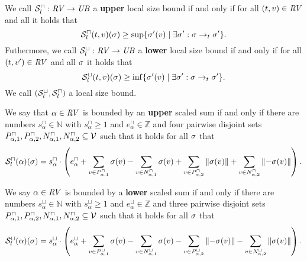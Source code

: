 \begin{definition}
  We call ${\mathcal{S}^\sqcap_l}: \mathit{RV} \rightarrow \mathit{UB}$ a \textbf{upper} local size bound if and only if for all $(t, v) \in \mathit{RV}$ and all  it holds that
  \[ {\mathcal{S}^\sqcap_l}(t, v)(\sigma) \geq \sup \lbrace \sigma'(v) \mid \exists \sigma': \sigma \rightarrow_t \sigma' \rbrace. \]
  Futhermore, we call ${\mathcal{S}^\sqcup_l}: \mathit{RV} \rightarrow \mathit{UB}$ a \textbf{lower} local size bound if and only if for all $(t, v') \in \mathit{RV}$ and all $\sigma$ it holds that
  \[ {\mathcal{S}^\sqcup_l}(t, v)(\sigma) \geq \inf \lbrace \sigma'(v) \mid \exists \sigma': \sigma \rightarrow_t \sigma' \rbrace. \]
  We call ${({\mathcal{S}^\sqcup_l}, {\mathcal{S}^\sqcap_l})}$ a local size bound.
\end{definition}

\begin{definition}
  We say that $\alpha \in \mathit{RV}$ is bounded by an \textbf{upper} scaled sum if and only if there are numbers $s^\sqcap_\alpha \in \mathbb{N}$ with $s^\sqcap_\alpha \geq 1$ and $e^\sqcap_\alpha \in \mathbb{Z}$ and four pairwise disjoint sets $P_{\alpha,1}^\sqcap, P_{\alpha,2}^\sqcap, N_{\alpha,1}^\sqcap, N_{\alpha,2}^\sqcap \subseteq \mathcal{V}$ such that it holds for all $\sigma$ that
  \[ {\mathcal{S}^\sqcap_l}(\alpha)(\sigma) =
    s^\sqcap_\alpha \cdot \left(
        e^\sqcap_\alpha
      + \sum_{v \in P_{\alpha,1}^\sqcap} \sigma(v)
      - \sum_{v \in N_{\alpha,1}^\sqcap} \sigma(v)
      + \sum_{v \in P_{\alpha,2}^\sqcap} \left\Vert\sigma(v)\right\Vert
      + \sum_{v \in N_{\alpha,2}^\sqcap} \left\Vert-\sigma(v)\right\Vert
    \right). \]

  We say $\alpha \in \mathit{RV}$ is bounded by a \textbf{lower} scaled sum if and only if there are numbers $s^\sqcup_\alpha \in \mathbb{N}$ with $s^\sqcup_\alpha \geq 1$ and $e^\sqcup_\alpha \in \mathbb{Z}$ and three pairwise disjoint sets $P_{\alpha,1}^\sqcap, P_{\alpha,2}^\sqcap, N_{\alpha,1}^\sqcap, N_{\alpha,2}^\sqcap \subseteq \mathcal{V}$ such that it holds for all $\sigma$ that
  \[ {\mathcal{S}^\sqcup_l}(\alpha)(\sigma) =
    s^\sqcup_\alpha \cdot \left(
      e^\sqcup_\alpha
    + \sum_{v \in P_{\alpha,1}^\sqcup} \sigma(v)
    - \sum_{v \in N_{\alpha,1}^\sqcup} \sigma(v)
    - \sum_{v \in P_{\alpha,2}^\sqcup} \left\Vert-\sigma(v)\right\Vert
    - \sum_{v \in N_{\alpha,2}^\sqcup} \left\Vert\sigma(v)\right\Vert
  \right). \]
\end{definition}
